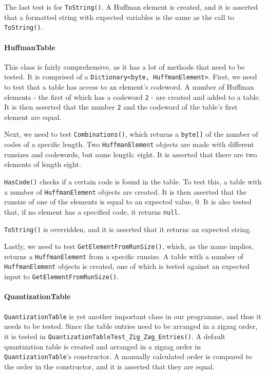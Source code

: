 The last test is for \lstinline|ToString()|.
A Huffman element is created, and it is asserted that a formatted string with expected variables is the same as the call to \lstinline|ToString()|.

\paragraph*{HuffmanTable}
This class is fairly comprehensive, as it has a lot of methods that need to be tested.
It is comprised of a \lstinline|Dictionary<byte, HuffmanElement>|.
First, we need to test that a table has access to an element's codeword.
A number of Huffman elements - the first of which has a codeword \lstinline|2| - are created and added to a table.
It is then asserted that the number \lstinline|2| and the codeword of the table's first element are equal.

Next, we need to test \lstinline|Combinations()|, which returns a \lstinline|byte[]| of the number of codes of a specific length.
Two \lstinline|HuffmanElement| objects are made with different runsizes and codewords, but same length: eight.
It is asserted that there are two elements of length eight.

\lstinline|HasCode()| checks if a certain code is found in the table.
To test this, a table with a number of \lstinline|HuffmanElement| objects are created.
It is then asserted that the runsize of one of the elements is equal to an expected value, 0.
It is also tested that, if no element has a specified code, it returns \lstinline|null|.

\lstinline|ToString()| is overridden, and it is asserted that it returns an expected string.

Lastly, we need to test \lstinline|GetElementFromRunSize()|, which, as the name implies, returns a \lstinline|HuffmanElement| from a specific runsize.
A table with a number of \lstinline|HuffmanElement| objects is created, one of which is tested against an expected input to \lstinline|GetElementFromRunSize()|.

\paragraph*{QuantizationTable}
\lstinline|QuantizationTable| is yet another important class in our programme, and thus it needs to be tested.
Since the table entries need to be arranged in a zigzag order, it is tested in \lstinline|QuantizationTableTest_Zig_Zag_Entries()|.
A default quantization table is created and arranged in a zigzag order in \lstinline|QuantizationTable|'s constructor.
A manually calculated order is compared to the order in the constructor, and it is asserted that they are equal.

